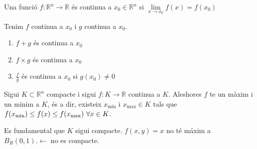\documentclass[../main.tex]{subfiles}
\begin{document}
    \begin{definicio}
        Una funció $f: \mathbb{R}^n \rightarrow \mathbb{R}$ és continua a $x_0 \in \mathbb{R}^n$ si $\lim\limits_{x \rightarrow x_0} f(x) = f(x_0)$
    \end{definicio}
    \begin{corolari}
        Tenim $f$ continua a $x_0$ i $g$ continua a $x_0$.
        \begin{enumerate}
            \item $f+g$ és continua a $x_0$
            \item $f\times g$ és continua a $x_0$
            \item $\frac{f}{g}$ és continua a $x_0$ si $g(x_0) \neq 0$
        \end{enumerate}
    \end{corolari}
    \begin{teorema}
        Sigui $K \subset \mathbb{R}^n$ compacte i sigui $f: K \rightarrow \mathbb{R}$ continua a $K$.
        Aleshores $f$ te un màxim i un minim a $K$, és a dir, existeix $x_\text{min}$ i $x_\text{max} \in K$
        tals que $f(x_\text{min}) \leq f(x) \leq f(x_\text{max}) \hbox{ } \forall x \in K$.
    \end{teorema}
    \begin{obs}
        Es fundamental que $K$ sigui compacte. $f(x,y) = x$ no té máxim a $B_R(0,1). \leftarrow$ no
        es compacte.
    \end{obs}
\end{document}
